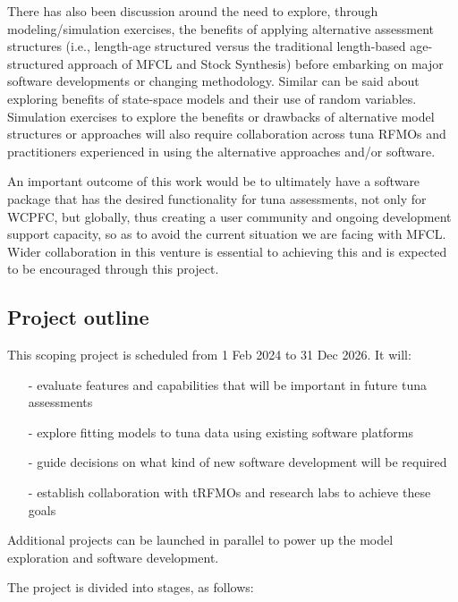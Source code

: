 \documentclass{SCreport}
\begin{document}
There has also been discussion around the need to explore, through
modeling/simulation exercises, the benefits of applying alternative assessment
structures (i.e., length-age structured versus the traditional length-based
age-structured approach of MFCL and Stock Synthesis) before embarking on major
software developments or changing methodology. Similar can be said about
exploring benefits of state-space models and their use of random variables.
Simulation exercises to explore the benefits or drawbacks of alternative model
structures or approaches will also require collaboration across tuna RFMOs and
practitioners experienced in using the alternative approaches and/or software.

An important outcome of this work would be to ultimately have a software package
that has the desired functionality for tuna assessments, not only for WCPFC, but
globally, thus creating a user community and ongoing development support
capacity, so as to avoid the current situation we are facing with MFCL. Wider
collaboration in this venture is essential to achieving this and is expected to
be encouraged through this project.

\subsection{Project outline}
\label{sec:project-outline}

This scoping project is scheduled from 1 Feb 2024 to 31 Dec 2026. It will:

\begin{itemize}
  \item[-] evaluate features and capabilities that will be important in future
  tuna assessments\\[-4.5ex]
  \item[-] explore fitting models to tuna data using existing software
  platforms\\[-4.5ex]
  \item[-] guide decisions on what kind of new software development will be
  required\\[-4.5ex]
  \item[-] establish collaboration with tRFMOs and research labs to achieve
  these goals
\end{itemize}

Additional projects can be launched in parallel to power up the model
exploration and software development.

The project is divided into stages, as follows:
\end{document}
